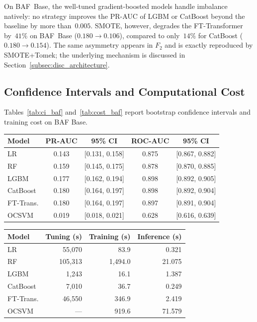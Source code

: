 \documentclass[a4paper,fleqn]{cas-sc}
\begin{document}
On BAF~Base, the well-tuned gradient-boosted models handle imbalance natively: no
strategy improves the PR-AUC of LGBM or CatBoost beyond the baseline by more than~$0.005$.
SMOTE, however, degrades the FT-Transformer by~$41\%$ on BAF~Base ($0.180\!\to\!0.106$),
compared to only~$14\%$ for CatBoost ($0.180\!\to\!0.154$). The same asymmetry appears
in $F_2$ and is exactly reproduced by SMOTE+Tomek; the underlying mechanism is
discussed in Section~\ref{subsec:disc_architecture}.

\subsection{Confidence Intervals and Computational Cost}
\label{subsec:ci_cost}

Tables~\ref{tab:ci_baf} and~\ref{tab:cost_baf} report bootstrap confidence intervals
and training cost on BAF Base.

\par\medskip\noindent\begin{minipage}{\linewidth}\centering
{}
\label{tab:ci_baf}
\begin{tabular}{l c c c c}
\toprule
Model & PR-AUC & 95\% CI & ROC-AUC & 95\% CI \\
\midrule
LR         & 0.143 & [0.131, 0.158] & 0.875 & [0.867, 0.882] \\
RF         & 0.159 & [0.145, 0.175] & 0.878 & [0.870, 0.885] \\
LGBM       & 0.177 & [0.162, 0.194] & 0.898 & [0.892, 0.905] \\
CatBoost   & 0.180 & [0.164, 0.197] & 0.898 & [0.892, 0.904] \\
FT-Trans.  & 0.180 & [0.164, 0.197] & 0.897 & [0.891, 0.904] \\
OCSVM      & 0.019 & [0.018, 0.021] & 0.628 & [0.616, 0.639] \\
\bottomrule
\end{tabular}
\end{minipage}\par\medskip

\par\medskip\noindent\begin{minipage}{\linewidth}\centering
{}
\label{tab:cost_baf}
\begin{tabular}{l r r r}
\toprule
Model & Tuning (s) & Training (s) & Inference (s) \\
\midrule
LR         & 55,070 & 83.9 & 0.321 \\
RF         & 105,313 & 1,494.0 & 21.075 \\
LGBM       & 1,243 & 16.1 & 1.387 \\
CatBoost   & 7,010 & 36.7 & 0.249 \\
FT-Trans.  & 46,550 & 346.9 & 2.419 \\
OCSVM      & --- & 919.6 & 71.579 \\
\bottomrule
\end{tabular}
\end{minipage}\par\medskip
\end{document}
